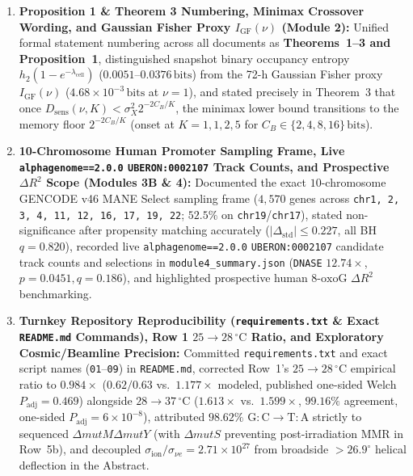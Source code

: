 \documentclass[10pt,letterpaper]{article}
\newcommand{\oxog}{\text{8-oxoG}}
\begin{document}
\begin{enumerate}[leftmargin=1.8em,itemsep=3pt]
    \item \textbf{Proposition 1 \& Theorem 3 Numbering, Minimax Crossover Wording, and Gaussian Fisher Proxy $I_{\mathrm{GF}}(\nu)$ (Module 2):} Unified formal statement numbering across all documents as \textbf{Theorems~1--3 and Proposition~1}, distinguished snapshot binary occupancy entropy $h_2(1 - e^{-\lambda_{\mathrm{cell}}})$ ($0.0051$--$0.0376\,\mathrm{bits}$) from the 72-h Gaussian Fisher proxy $I_{\mathrm{GF}}(\nu)$ ($4.68 \times 10^{-3}\,\mathrm{bits}$ at $\nu=1$), and stated precisely in Theorem~3 that once $D_{\mathrm{sens}}(\nu, K) < \sigma_X^2 2^{-2C_B/K}$, the minimax lower bound transitions to the memory floor $2^{-2C_B/K}$ (onset at $K = 1, 1, 2, 5$ for $C_B \in \{2, 4, 8, 16\}\,\mathrm{bits}$).
    \item \textbf{10-Chromosome Human Promoter Sampling Frame, Live \texttt{alphagenome==2.0.0} \texttt{UBERON:0002107} Track Counts, and Prospective $\Delta R^2$ Scope (Modules 3B \& 4):} Documented the exact $10$-chromosome GENCODE v46 MANE Select sampling frame ($4{,}570$ genes across \texttt{chr1, 2, 3, 4, 11, 12, 16, 17, 19, 22}; $52.5\%$ on \texttt{chr19}/\texttt{chr17}), stated non-significance after propensity matching accurately ($|\Delta_{\mathrm{std}}| \le 0.227$, all BH $q = 0.820$), recorded live \texttt{alphagenome==2.0.0} \texttt{UBERON:0002107} candidate track counts and selections in \texttt{module4\_summary.json} (\texttt{DNASE} $12.74\times$, $p = 0.0451, q = 0.186$), and highlighted prospective human $\oxog$ $\Delta R^2$ benchmarking.
    \item \textbf{Turnkey Repository Reproducibility (\texttt{requirements.txt} \& Exact \texttt{README.md} Commands), Row 1 $25 \to 28\,^\circ\mathrm{C}$ Ratio, and Exploratory Cosmic/Beamline Precision:} Committed \texttt{requirements.txt} and exact script names (\texttt{01}--\texttt{09}) in \texttt{README.md}, corrected Row~1's $25 \to 28\,^\circ\mathrm{C}$ empirical ratio to $0.984\times$ ($0.62/0.63$ vs.\ $1.177\times$ modeled, published one-sided Welch $P_{\mathrm{adj}} = 0.469$) alongside $28 \to 37\,^\circ\mathrm{C}$ ($1.613\times$ vs.\ $1.599\times$, $99.16\%$ agreement, one-sided $P_{\mathrm{adj}} = 6 \times 10^{-8}$), attributed $98.62\%$ $\mathrm{G{:}C \to T{:}A}$ strictly to sequenced $\Delta\textit{mutM}\Delta\textit{mutY}$ (with $\Delta\textit{mutS}$ preventing post-irradiation MMR in Row~5b), and decoupled $\sigma_{\mathrm{ion}}/\sigma_{\nu e} = 2.71 \times 10^{27}$ from broadside $>26.9^\circ$ helical deflection in the Abstract.
\end{enumerate}
\end{document}
